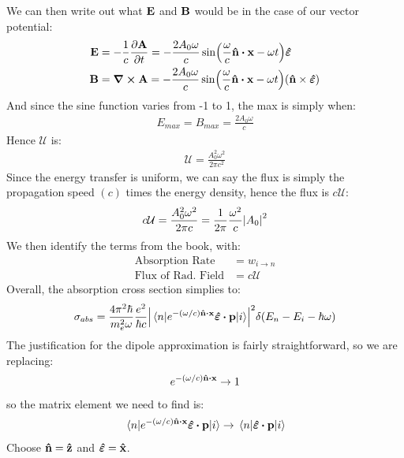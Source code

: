 \documentclass[12pt]{article}
\begin{document}
We can then write out what $\vb{E}$ and $\vb{B}$ would be in the case of our vector potential:
\begin{align*}
  \vb{E}&=-\frac1c\pdv{\vb{A}}{t}=-\frac{2A_0\omega}c
  \sin(\frac{\omega}{c}\vu{n}\vdot\vb{x}-\omega t)\bm{\hat{\veps}}\\
  \vb{B}&=\curl{\vb{A}}=-\frac{2A_0\omega}c
  \sin(\frac{\omega}{c}\vu{n}\vdot\vb{x}-\omega t)
  \qty(\vu{n}\times\bm{\hat{\veps}})
\end{align*}
And since the sine function varies from -1 to 1, the max is simply when:
\begin{align*}
  E_{max}=B_{max}=\frac{2A_0\omega}{c}
\end{align*}
Hence $\mathcal{U}$ is:
\begin{align*}
  \mathcal{U}=\frac{A_0^2\omega^2}{2\pi c^2}
\end{align*}
Since the energy transfer is uniform, we can say the flux is simply the propagation speed $(c)$ times the energy density, hence the flux is $c\mathcal{U}$:
\begin{align*}
  c\mathcal{U}=\frac{A_0^2\omega^2}{2\pi c}=
  \frac1{2\pi}\frac{\omega^2}c\abs{A_0}^2
\end{align*}
We then identify the terms from the book, with:
\begin{align*}
  \text{Absorption Rate }&=w_{i\to n}\\
  \text{Flux of Rad. Field}&=c\mathcal{U}
\end{align*}
Overall, the absorption cross section simplies to:
\begin{align*}
  \sigma_{abs}=\frac{4\pi^2\hbar}{m_e^2\omega}\frac{e^2}{\hbar c}
  \abs{\mel{n}{e^{-(\omega/c)\vu{n}\vdot\vb{x}}\bm{\hat{\veps}}\vdot\vb{p}}{i}}^2
  \delta(E_n-E_i-\hbar\omega)
\end{align*}
The justification for the dipole approximation is fairly straightforward, so we are replacing:
\begin{align*}
  e^{-(\omega/c)\vu{n}\vdot\vb{x}}\to 1
\end{align*}
so the matrix element we need to find is:
\begin{align*}
  \mel{n}{e^{-(\omega/c)\vu{n}\vdot\vb{x}}\bm{\hat{\veps}}\vdot\vb{p}}{i}
  \to\mel{n}{\bm{\hat{\veps}}\vdot\vb{p}}{i}
\end{align*}
Choose $\vu{n}=\vu{z}$ and $\bm{\hat{\varepsilon}}=\vu{x}$.
\end{document}
